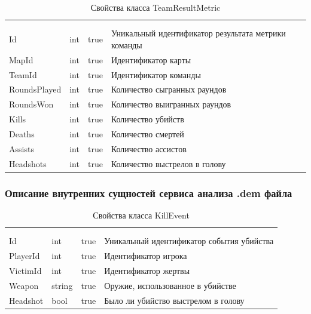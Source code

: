 \begin{xltabular}{\textwidth}{|X|X|X|X|}
	\caption{Свойства класса TeamResultMetric}\label{table:TeamResultMetric}\\ \hline
	 &  &  &  \\ \hline
	 &  &  &  \\ \hline
	\endfirsthead
	 \hline
	 &  &  &  \\ \hline
	\endhead
	Id & int & true & Уникальный идентификатор результата метрики команды \\ \hline
	MapId & int & true & Идентификатор карты \\ \hline
	TeamId & int & true & Идентификатор команды \\ \hline
	RoundsPlayed & int & true & Количество сыгранных раундов \\ \hline
	RoundsWon & int & true & Количество выигранных раундов \\ \hline
	Kills & int & true & Количество убийств \\ \hline
	Deaths & int & true & Количество смертей \\ \hline
	Assists & int & true & Количество ассистов \\ \hline
	Headshots & int & true & Количество выстрелов в голову \\ \hline
\end{xltabular}

\subsubsection{Описание внутренних сущностей сервиса анализа .dem файла}

\begin{xltabular}{\textwidth}{|X|X|X|X|}
	\caption{Свойства класса KillEvent}\label{table:KillEvent}\\ \hline
	 &  &  &  \\ \hline
	 &  &  &  \\ \hline
	\endfirsthead
	 \hline
	 &  &  &  \\ \hline
	\endhead
	Id & int & true & Уникальный идентификатор события убийства \\ \hline
	PlayerId & int & true & Идентификатор игрока \\ \hline
	VictimId & int & true & Идентификатор жертвы \\ \hline
	Weapon & string & true & Оружие, использованное в убийстве \\ \hline
	Headshot & bool & true & Было ли убийство выстрелом в голову \\ \hline
\end{xltabular}

